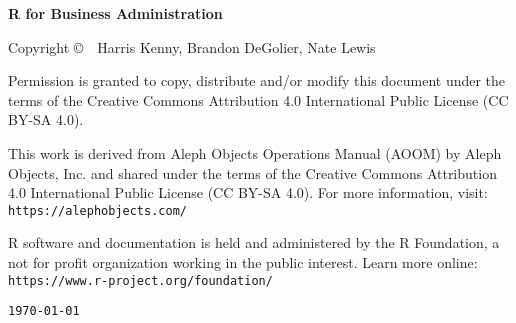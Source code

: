 %
%
%
%
%

\clearpage\null\vfill
\begingroup 
\thispagestyle{empty}
\footnotesize\raggedright
\setlength{\parskip}{0.5\baselineskip}

\textbf{R for Business Administration}

Copyright \copyright\ \the\year\ Harris Kenny, Brandon DeGolier, Nate Lewis\par
Permission is granted to copy, distribute and\slash or modify 
this document under the terms of the
Creative Commons Attribution 4.0 International Public License
(CC BY-SA 4.0).

This work is derived from Aleph Objects Operations Manual (AOOM) by 
Aleph Objects, Inc. and shared under the terms of the 
Creative Commons Attribution 4.0 International Public License 
(CC BY-SA 4.0). For more information, visit: \texttt{https://alephobjects.com/}

R software and documentation is held and administered by the R
Foundation, a not for profit organization working in the public interest.
Learn more online: \texttt{https://www.r-project.org/foundation/}

\renewcommand{\dateseparator}{}
\hfill\texttt{\yyyymmdddate\today} %
\endgroup
\pagebreak{}

